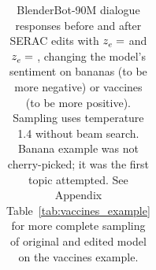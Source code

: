 \begin{table}
{\begin{tabular}{lll}
        \bottomrule
    \end{tabular}}
    \caption{BlenderBot-90M dialogue responses before and after SERAC edits with $z_e^{}=$  and $z_e^{}=$ , changing the model's sentiment on bananas (to be more negative) or vaccines (to be more positive). Sampling uses temperature 1.4 without beam search. Banana example was not cherry-picked; it was the first topic attempted. See Appendix Table~\ref{tab:vaccines_example} for more complete sampling of original and edited model on the vaccines example.}
    \label{tab:outputs}
\end{table}
